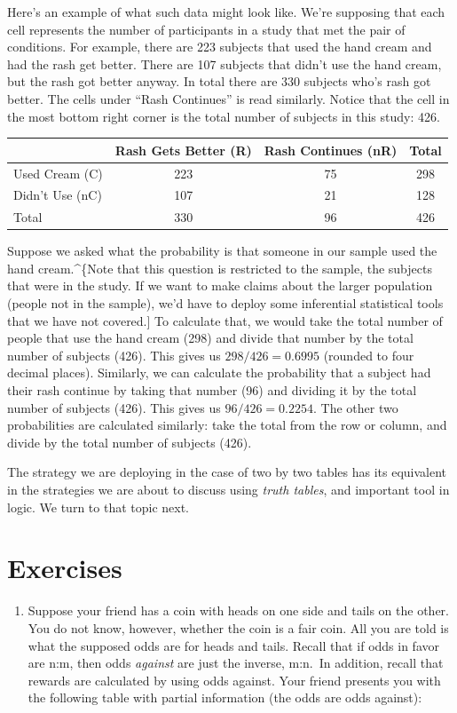 \documentclass[]{tufte-book}
\providecommand{\tightlist}{%
  \setlength{\itemsep}{0pt}\setlength{\parskip}{0pt}}
\begin{document}
Here's an example of what such data might look like. We're supposing that each cell represents the number of participants in a study that met the pair of conditions. For example, there are 223 subjects that used the hand cream and had the rash get better. There are 107 subjects that didn't use the hand cream, but the rash got better anyway. In total there are 330 subjects who's rash got better. The cells under ``Rash Continues'' is read similarly. Notice that the cell in the most bottom right corner is the total number of subjects in this study: 426.

\begin{longtable}[]{@{}lccc@{}}
\toprule
& Rash Gets Better (R) & Rash Continues (nR) & Total\tabularnewline
\midrule
\endhead
Used Cream (C) & 223 & 75 & 298\tabularnewline
Didn't Use (nC) & 107 & 21 & 128\tabularnewline
Total & 330 & 96 & 426\tabularnewline
\bottomrule
\end{longtable}

Suppose we asked what the probability is that someone in our sample used the hand cream.\^{}\{Note that this question is restricted to the sample, the subjects that were in the study. If we want to make claims about the larger population (people not in the sample), we'd have to deploy some inferential statistical tools that we have not covered.{]} To calculate that, we would take the total number of people that use the hand cream (298) and divide that number by the total number of subjects (426). This gives us \(298/426=0.6995\) (rounded to four decimal places). Similarly, we can calculate the probability that a subject had their rash continue by taking that number (96) and dividing it by the total number of subjects (426). This gives us \(96/426=0.2254\). The other two probabilities are calculated similarly: take the total from the row or column, and divide by the total number of subjects (426).

The strategy we are deploying in the case of two by two tables has its equivalent in the strategies we are about to discuss using \emph{truth tables}, and important tool in logic. We turn to that topic next.

\hypertarget{exercises-7}{%
\section*{Exercises}\label{exercises-7}}

\begin{enumerate}
\def\labelenumi{\arabic{enumi}.}
\tightlist
\item
  Suppose your friend has a coin with heads on one side and tails on the other. You do not know, however, whether the coin is a fair coin. All you are told is what the supposed odds are for heads and tails. Recall that if odds in favor are n:m, then odds \emph{against} are just the inverse, m:n.~In addition, recall that rewards are calculated by using odds against. Your friend presents you with the following table with partial information (the odds are odds against):
\end{enumerate}
\end{document}
